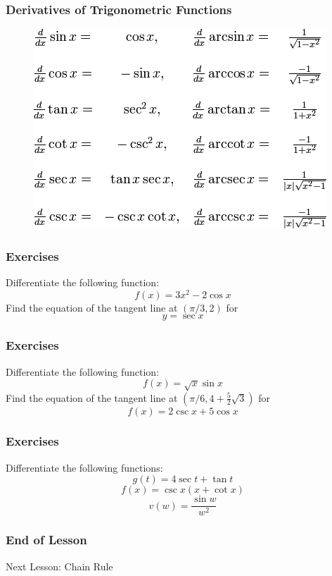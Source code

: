 \documentclass[xcolor=dvipsnames]{beamer}
\begin{document}
\begin{frame}
  \frametitle{Derivatives of Trigonometric Functions}
\begin{figure}[h]
\includegraphics[scale=.6]{./diagrams/trigdiff.png}
\end{figure}
\end{frame}

\begin{frame}
  \frametitle{Exercises}
{\ubung} Differentiate the following function:
\begin{equation}
  \label{eq:hupuxahz}
  f(x)=3x^{2}-2\cos{}x
\end{equation}
{\ubung} Find the equation of the tangent line at $(\pi/3,2)$ for
\begin{equation}
  \label{eq:hoirohfo}
  y=\sec{}x
\end{equation}
\end{frame}

\begin{frame}
  \frametitle{Exercises}
{\ubung} Differentiate the following function:
\begin{equation}
  \label{eq:vithooke}
  f(x)=\sqrt{x}\sin{}x
\end{equation}
{\ubung} Find the equation of the tangent line at $(\pi/6,4+\frac{5}{2}\sqrt{3})$ for
\begin{equation}
  \label{eq:chaequin}
  f(x)=2\csc{}x+5\cos{}x
\end{equation}
\end{frame}

\begin{frame}
  \frametitle{Exercises}
{\ubung} Differentiate the following functions:
\begin{equation}
  \label{eq:hohxenoo}
  g(t)=4\sec{}t+\tan{}t
\end{equation}
\begin{equation}
  \label{eq:zichoope}
  f(x)=\csc{}x(x+\cot{}x)
\end{equation}
\begin{equation}
  \label{eq:tohsohgh}
  v(w)=\frac{\sin{}w}{w^{2}}
\end{equation}
\end{frame}

\begin{frame}
  \frametitle{End of Lesson}
Next Lesson: Chain Rule
\end{frame}
\end{document}
